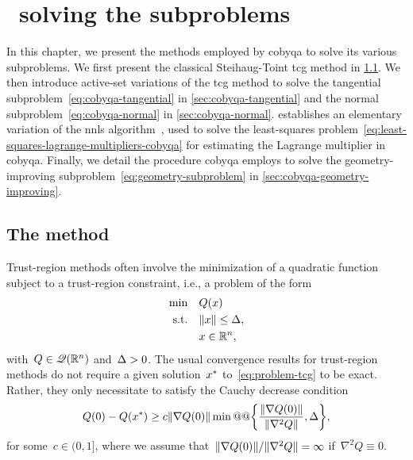 %
%
%
\chapter{ \textemdash\ solving the subproblems}
\label{ch:cobyqa-subproblems}

In this chapter, we present the methods employed by \gls{cobyqa} to solve its various subproblems.
We first present the classical Steihaug-Toint \gls{tcg} method in \cref{sec:tcg}.
We then introduce active-set variations of the \gls{tcg} method to solve the tangential subproblem~\cref{eq:cobyqa-tangential} in \cref{sec:cobyqa-tangential} and the normal subproblem~\cref{eq:cobyqa-normal} in \cref{sec:cobyqa-normal}.
 establishes an elementary variation of the \gls{nnls} algorithm~\cite[Alg.~(23.10)]{Lawson_Hanson_1987}, used to solve the least-squares problem~\cref{eq:least-squares-lagrange-multipliers-cobyqa} for estimating the Lagrange multiplier in \gls{cobyqa}.
Finally, we detail the procedure \gls{cobyqa} employs to solve the geometry-improving subproblem~\cref{eq:geometry-subproblem} in \cref{sec:cobyqa-geometry-improving}.

\section{The  method}
\label{sec:tcg}

Trust-region methods often involve the minimization of a quadratic function subject to a trust-region constraint, i.e., a problem of the form
\begin{subequations}
    \label{eq:problem-tcg}
    \begin{align}
        \min        & \quad Q(\iter)\\
        \text{s.t.} & \quad \norm{\iter} \le \rad,\\
                    & \quad \iter \in \R^n, \nonumber
    \end{align}
\end{subequations}
with~$Q \in \mathscr{Q}(\mathbb{R}^n)$ and~$\rad > 0$.
The usual convergence results for trust-region methods do not require a given solution~$\iter[\ast]$ to~\cref{eq:problem-tcg} to be exact.
Rather, they only necessitate to satisfy the Cauchy decrease condition
\begin{equation*}
    Q(0) - Q(\iter[\ast]) \ge c \norm{\nabla Q(0)} \min @@ \set[\bigg]{\frac{\norm{\nabla Q(0)}}{\norm{\nabla^2 Q}}, \rad},
\end{equation*}
for some~$c \in (0, 1]$, where we assume that~$\lVert\nabla Q(0)\rVert / \lVert\nabla^2 Q\rVert = \infty$ if~$\nabla^2 Q \equiv 0$.

